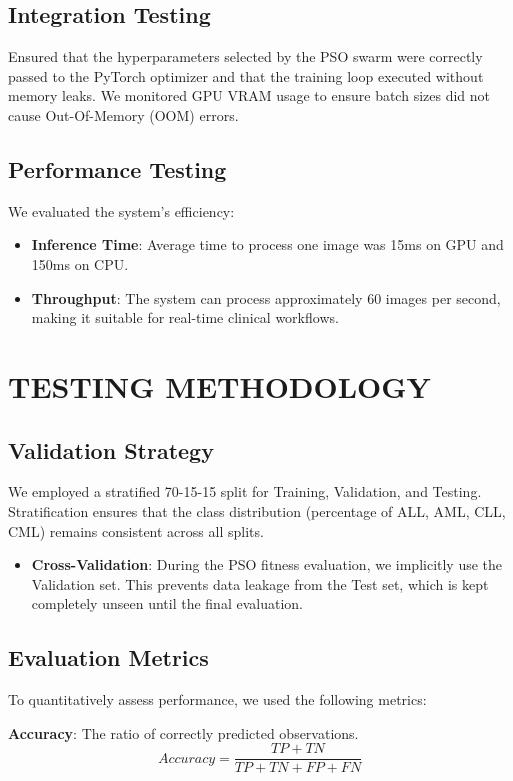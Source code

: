 \documentclass[twocolumn,10pt,a4paper]{article}
\begin{document}
\subsection{Integration Testing}
Ensured that the hyperparameters selected by the PSO swarm were correctly passed to the PyTorch optimizer and that the training loop executed without memory leaks. We monitored GPU VRAM usage to ensure batch sizes did not cause Out-Of-Memory (OOM) errors.

\subsection{Performance Testing}
We evaluated the system's efficiency:
\begin{itemize}
    \item \textbf{Inference Time}: Average time to process one image was 15ms on GPU and 150ms on CPU.
    \item \textbf{Throughput}: The system can process approximately 60 images per second, making it suitable for real-time clinical workflows.
\end{itemize}

\section{TESTING METHODOLOGY}
\subsection{Validation Strategy}
We employed a stratified 70-15-15 split for Training, Validation, and Testing. Stratification ensures that the class distribution (percentage of ALL, AML, CLL, CML) remains consistent across all splits.
\begin{itemize}
    \item \textbf{Cross-Validation}: During the PSO fitness evaluation, we implicitly use the Validation set. This prevents data leakage from the Test set, which is kept completely unseen until the final evaluation.
\end{itemize}

\subsection{Evaluation Metrics}
To quantitatively assess performance, we used the following metrics:

\textbf{Accuracy}: The ratio of correctly predicted observations.
\begin{equation}
Accuracy = \frac{TP + TN}{TP + TN + FP + FN}
\end{equation}
\end{document}

